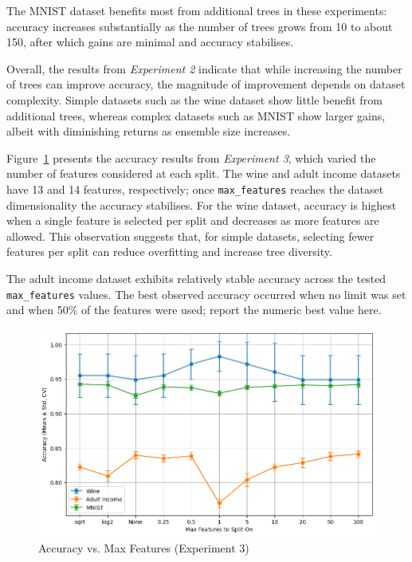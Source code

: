 \documentclass[conference]{IEEEtran}
\begin{document}
The MNIST dataset benefits most from additional trees in these experiments: accuracy increases substantially as the number of trees grows from 10 to about 150, after which gains are minimal and accuracy stabilises.

Overall, the results from \textit{Experiment 2} indicate that while increasing the number of trees can improve accuracy, the magnitude of improvement depends on dataset complexity. Simple datasets such as the wine dataset show little benefit from additional trees, whereas complex datasets such as MNIST show larger gains, albeit with diminishing returns as ensemble size increases.

Figure~\ref{fig:acc_vs_max_feat_exp_3_2} presents the accuracy results from \textit{Experiment 3}, which varied the number of features considered at each split. The wine and adult income datasets have 13 and 14 features, respectively; once \texttt{max\_features} reaches the dataset dimensionality the accuracy stabilises. For the wine dataset, accuracy is highest when a single feature is selected per split and decreases as more features are allowed. This observation suggests that, for simple datasets, selecting fewer features per split can reduce overfitting and increase tree diversity.

The adult income dataset exhibits relatively stable accuracy across the tested \texttt{max\_features} values. The best observed accuracy occurred when no limit was set and when 50\% of the features were used; report the numeric best value here.

\begin{figure}
    \centering
    \includegraphics[width=\linewidth]{figures/acc_vs_max_feat_exp_3_2.png}
    \caption{Accuracy vs. Max Features (Experiment 3)}
    \label{fig:acc_vs_max_feat_exp_3_2}
\end{figure}
\end{document}
